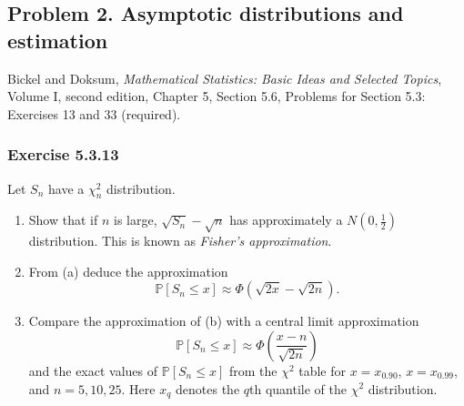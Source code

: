 \documentclass[lang=en,11pt,a4paper,citestyle=authoryear]{elegantpaper}
\renewcommand{\P}{\mathbb{P}}
\begin{document}
\subsection*{Problem 2. Asymptotic distributions and estimation}
Bickel and Doksum, \textit{Mathematical Statistics: Basic Ideas and
Selected Topics}, Volume I, second edition, Chapter 5, Section 5.6,
Problems for Section 5.3: Exercises 13 and 33 (required).

\subsubsection*{Exercise 5.3.13}
Let $S_n$ have a $\chi_n^2$ distribution.
\begin{enumerate}[label=(\alph*),leftmargin=*]
\item Show that if $n$ is large, $\sqrt{S_n}-\sqrt n$ has
approximately a $N\left(0,\tfrac12\right)$ distribution. This is known as
\emph{Fisher's approximation}.
\item From (a) deduce the approximation
\[
\P[S_n\le x]\approx\Phi(\sqrt{2x}-\sqrt{2n}).
\]
\item Compare the approximation of (b) with a central limit
approximation
\[
\P[S_n\le x]\approx\Phi\!\left(\frac{x-n}{\sqrt{2n}}\right)
\]
and the exact values of $\P[S_n\le x]$ from the $\chi^2$ table for
$x=x_{0.90}$, $x=x_{0.99}$, and $n=5,10,25$. Here $x_q$ denotes
the $q$th quantile of the $\chi^2$ distribution.
\end{enumerate}
\end{document}
